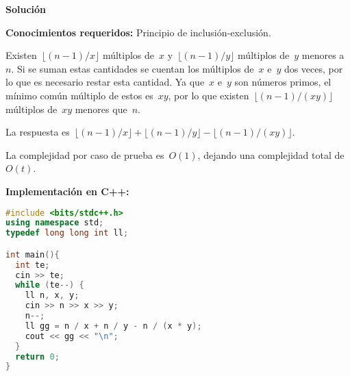 \vspace*{0cm}
{\Large\textbf{Solución}}

\textbf{Conocimientos requeridos:} Principio de inclusión-exclusión.

Existen~$\lfloor (n - 1) / x \rfloor$ múltiplos de~$x$
y~$\lfloor (n - 1) / y \rfloor$ múltiplos de~$y$ menores a~$n$. Si se suman estas
cantidades se cuentan los múltiplos de~$x$ e~$y$ dos veces, por lo que es necesario
restar esta cantidad. Ya que~$x$ e~$y$ son números primos, el mínimo común múltiplo
de estos es~$xy$, por lo que existen~$\lfloor (n - 1) / (xy) \rfloor$ múltiplos
de~$xy$ menores que~$n$.

La respuesta
es~$\lfloor (n - 1) / x \rfloor + \lfloor (n - 1) / y \rfloor - \lfloor (n - 1) /
(xy) \rfloor$.

La complejidad por caso de prueba es~$O(1)$, dejando una complejidad total de~$O(t)$.

\textbf{Implementación en C++:}

\begin{lstlisting}[language=C++]
#include <bits/stdc++.h>
using namespace std;
typedef long long int ll;

int main(){
  int te;
  cin >> te;
  while (te--) {
    ll n, x, y;
    cin >> n >> x >> y;
    n--;
    ll gg = n / x + n / y - n / (x * y);
    cout << gg << "\n";
  }
  return 0;
}
\end{lstlisting}

\newpage

